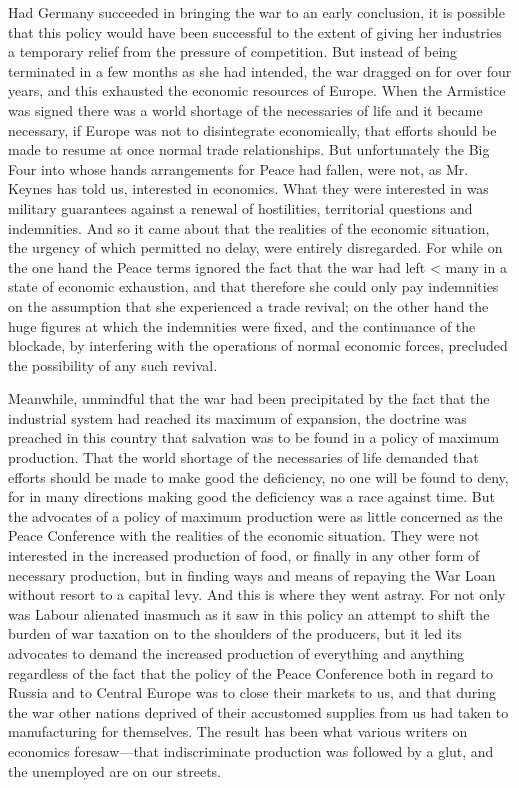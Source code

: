 \documentclass{book}
\begin{document}
Had Germany succeeded in bringing the war to an early conclusion, it is possible that this policy would have been successful to the extent of giving her industries a temporary relief from the pressure of competition. But instead of being terminated in a few months as she had intended, the war dragged on for over four years, and this exhausted the economic resources of Europe. When the Armistice was signed there was a world shortage of the necessaries of life and it became necessary, if Europe was not to disintegrate economically, that efforts should be made to resume at once normal trade relationships. But unfortunately the Big Four into whose hands arrangements for Peace had fallen, were not, as Mr. Keynes has told us, interested in economics. What they were interested in was military guarantees against a renewal of hostilities, territorial questions and indemnities. And so it came about that the realities of the economic situation, the urgency of which permitted no delay, were entirely disregarded. For while on the one hand the Peace terms ignored the fact that the war had left < many in a state of economic exhaustion, and that therefore she could only pay indemnities on the assumption that she experienced a trade revival; on the other hand the huge figures at which the indemnities were fixed, and the continuance of the blockade, by interfering with the operations of normal economic forces, precluded the possibility of any such revival.

Meanwhile, unmindful that the war had been precipitated by the fact that the industrial system had reached its maximum of expansion, the doctrine was preached in this country that salvation was to be found in a policy of maximum production. That the world shortage of the necessaries of life demanded that efforts should be made to make good the deficiency, no one will be found to deny, for in many directions making good the deficiency was a race against time. But the advocates of a policy of maximum production were as little concerned as the Peace Conference with the realities of the economic situation. They were not interested in the increased production of food, or finally in any other form of necessary production, but in finding ways and means of repaying the War Loan without resort to a capital levy. And this is where they went astray. For not only was Labour alienated inasmuch as it saw in this policy an attempt to shift the burden of war taxation on to the shoulders of the producers, but it led its advocates to demand the increased production of everything and anything regardless of the fact that the policy of the Peace Conference both in regard to Russia and to Central Europe was to close their markets to us, and that during the war other nations deprived of their accustomed supplies from us had taken to manufacturing for themselves. The result has been what various writers on economics foresaw—that indiscriminate production was followed by a glut, and the unemployed are on our streets.
\end{document}
